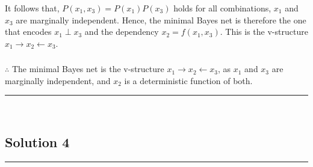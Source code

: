 \documentclass{article}
\begin{document}
It follows that, $P(x_1, x_3) = P(x_1)P(x_3)$ holds for all combinations, $x_1$ and $x_3$ are marginally independent.
Hence, the minimal Bayes net is therefore the one that encodes $x_1 \perp x_3$ and the dependency $x_2 = f(x_1, x_3)$. This is the v-structure $x_1 \to x_2 \leftarrow x_3$.

\begin{center}
\end{center}

\subsubsection*{\normalfont}{$\therefore$ The minimal Bayes net is the v-structure $x_1 \to x_2 \leftarrow x_3$, as $x_1$ and $x_3$ are marginally independent, and $x_2$ is a deterministic function of both.}

\noindent\rule{\textwidth}{0.4pt}\\

\newpage

\subsection*{Solution 4}
\noindent\rule{\textwidth}{0.4pt}\\
\end{document}
